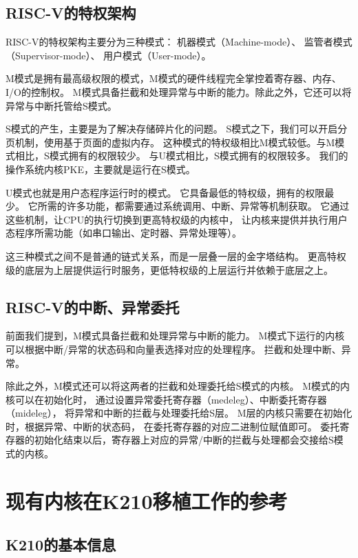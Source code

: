 \subsection{RISC-V的特权架构}

RISC-V的特权架构主要分为三种模式：
机器模式（Machine-mode）、
监管者模式（Supervisor-mode）、
用户模式（User-mode）\cite{2015The}。

M模式是拥有最高级权限的模式，M模式的硬件线程完全掌控着寄存器、内存、I/O的控制权。
M模式具备拦截和处理异常与中断的能力。除此之外，它还可以将异常与中断托管给S模式。

S模式的产生，主要是为了解决存储碎片化的问题。
S模式之下，我们可以开启分页机制，使用基于页面的虚拟内存。
这种模式的特权级相比M模式较低。与M模式相比，S模式拥有的权限较少。
与U模式相比，S模式拥有的权限较多。
我们的操作系统内核PKE，主要就是运行在S模式。

U模式也就是用户态程序运行时的模式。
它具备最低的特权级，拥有的权限最少。
它所需的许多功能，都需要通过系统调用、中断、异常等机制获取。
它通过这些机制，让CPU的执行切换到更高特权级的内核中，
让内核来提供并执行用户态程序所需功能（如串口输出、定时器、异常处理等）。

这三种模式之间不是普通的链式关系，而是一层叠一层的金字塔结构。
更高特权级的底层为上层提供运行时服务，更低特权级的上层运行并依赖于底层之上。

\subsection{RISC-V的中断、异常委托}

前面我们提到，M模式具备拦截和处理异常与中断的能力。
M模式下运行的内核可以根据中断/异常的状态码和向量表选择对应的处理程序。
拦截和处理中断、异常。

除此之外，M模式还可以将这两者的拦截和处理委托给S模式的内核。
M模式的内核可以在初始化时，
通过设置异常委托寄存器（medeleg）、中断委托寄存器（mideleg），
将异常和中断的拦截与处理委托给S层。
M层的内核只需要在初始化时，根据异常、中断的状态码，
在委托寄存器的对应二进制位赋值即可。
委托寄存器的初始化结束以后，寄存器上对应的异常/中断的拦截与处理都会交接给S模式的内核。

\section{现有内核在K210移植工作的参考}

\subsection{K210的基本信息}

